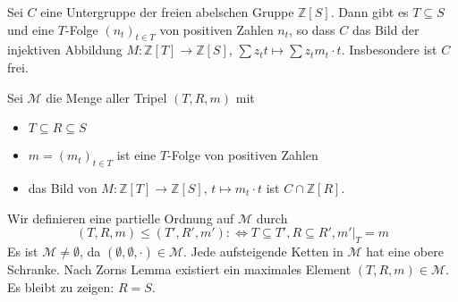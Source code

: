 \begin{lemma}
	Sei $C$ eine Untergruppe der freien abelschen Gruppe $\mathbb{Z}[S]$. Dann gibt es $T \subseteq S$ und eine $T$-Folge $(n_t)_{t \in T}$ von positiven Zahlen $n_t$, so dass $C$
	das Bild der injektiven Abbildung $M \colon \mathbb{Z}[T] \to \mathbb{Z}[S]$, $\sum z_t t \mapsto \sum z_t m_t \cdot t$. Insbesondere ist $C$ frei.
\end{lemma}
\begin{beweis}
	Sei $\mathcal{M}$ die Menge aller Tripel $(T,R,m)$ mit 
	\begin{itemize}
		\item $T \subseteq R \subseteq S$
		\item $m=(m_t)_{t \in T}$ ist eine $T$-Folge von positiven Zahlen
		\item das Bild von $M \colon \mathbb{Z}[T] \to \mathbb{Z}[S]$, $t \mapsto m_t \cdot t$ ist $C \cap \mathbb{Z}[R]$.
	\end{itemize}
	Wir definieren eine partielle Ordnung auf $\mathcal{M}$ durch
	\[
		(T,R,m) \le (T',R',m') :\iff T \subseteq T', R \subseteq R', m'|_{T}=m
	\]
	Es ist $\mathcal{M} \not= \emptyset$, da $(\emptyset,\emptyset, \cdot ) \in \mathcal{M}$. Jede aufsteigende Ketten in $\mathcal{M}$ hat eine obere Schranke. Nach Zorns Lemma 
	existiert ein maximales Element $(T,R,m) \in \mathcal{M}$. Es bleibt zu zeigen: $R=S$.
\end{beweis}






\cleardoubleoddemptypage
{}
\setcounter{page}{1}

\printindex
\listoffigures
\todototoc
{}

